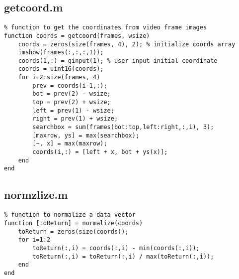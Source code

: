 \documentclass[12pt, a4paper]{article}
\begin{document}
\subsection{getcoord.m}
\begin{verbatim}
% function to get the coordinates from video frame images
function coords = getcoord(frames, wsize)
    coords = zeros(size(frames, 4), 2); % initialize coords array
    imshow(frames(:,:,:,1));
    coords(1,:) = ginput(1); % user input initial coordinate
    coords = uint16(coords);
    for i=2:size(frames, 4)
        prev = coords(i-1,:);
        bot = prev(2) - wsize;
        top = prev(2) + wsize;
        left = prev(1) - wsize;
        right = prev(1) + wsize;
        searchbox = sum(frames(bot:top,left:right,:,i), 3);
        [maxrow, ys] = max(searchbox);
        [~, x] = max(maxrow);
        coords(i,:) = [left + x, bot + ys(x)];
    end
end
\end{verbatim}

\subsection{normzlize.m}
\begin{verbatim}
% function to normalize a data vector
function [toReturn] = normalize(coords)
    toReturn = zeros(size(coords));
    for i=1:2
        toReturn(:,i) = coords(:,i) - min(coords(:,i));
        toReturn(:,i) = toReturn(:,i) / max(toReturn(:,i)); 
    end
end
\end{verbatim}
\end{document}
